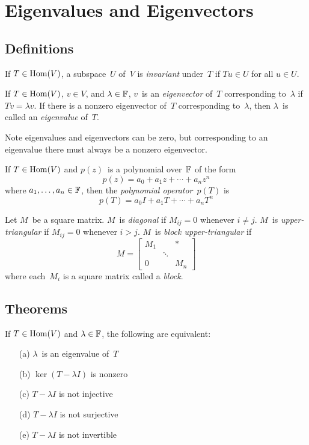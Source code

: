 %
%
%
\section{Eigenvalues and Eigenvectors}
\subsection*{Definitions}
\begin{defn}
If \(T\in\operatorname{Hom}(V)\), a subspace~\(U\) of~\(V\) is \emph{invariant} under~\(T\) if \(Tu\in U\) for all \(u\in U\).
\end{defn}

\begin{defn}
If \(T\in\operatorname{Hom}(V)\), \(v\in V\), and \(\lambda\in\mathbb{F}\), \(v\)~is an \emph{eigenvector} of~\(T\) corresponding to~\(\lambda\) if \(Tv=\lambda v\). If there is a nonzero eigenvector of~\(T\) corresponding to~\(\lambda\), then \(\lambda\)~is called an \emph{eigenvalue} of~\(T\).
\end{defn}
\begin{rmk}
Note eigenvalues and eigenvectors can be zero, but corresponding to an eigenvalue there must always be a nonzero eigenvector.
\end{rmk}

\begin{defn}
If \(T\in\operatorname{Hom}(V)\) and \(p(z)\)~is a polynomial over~\(\mathbb{F}\) of the form
\[p(z)=a_0+a_1z+\cdots+a_nz^n\]
where \(a_1,\ldots,a_n\in\mathbb{F}\), then the \emph{polynomial operator}~\(p(T)\) is
\[p(T)=a_0I+a_1T+\cdots+a_nT^n\]
\end{defn}

\begin{defn}
Let \(M\)~be a square matrix. \(M\)~is \emph{diagonal} if \(M_{ij}=0\) whenever \(i\ne j\). \(M\)~is \emph{upper-triangular} if \(M_{ij}=0\) whenever \(i>j\). \(M\)~is \emph{block upper-triangular} if
\[M=\left[\begin{matrix}
M_1&&*\\
&\ddots&\\
0&&M_n
\end{matrix}\right]\]
where each~\(M_i\) is a square matrix called a \emph{block}.
\end{defn}

\subsection*{Theorems}
\begin{thm}
If \(T\in\operatorname{Hom}(V)\) and \(\lambda\in\mathbb{F}\), the following are equivalent:
\begin{enumerate}[itemsep=0pt]
\item[(a)] \(\lambda\)~is an eigenvalue of~\(T\)
\item[(b)] \(\ker(T-\lambda I)\) is nonzero
\item[(c)] \(T-\lambda I\) is not injective
\item[(d)] \(T-\lambda I\) is not surjective
\item[(e)] \(T-\lambda I\) is not invertible
\end{enumerate}
\end{thm}

